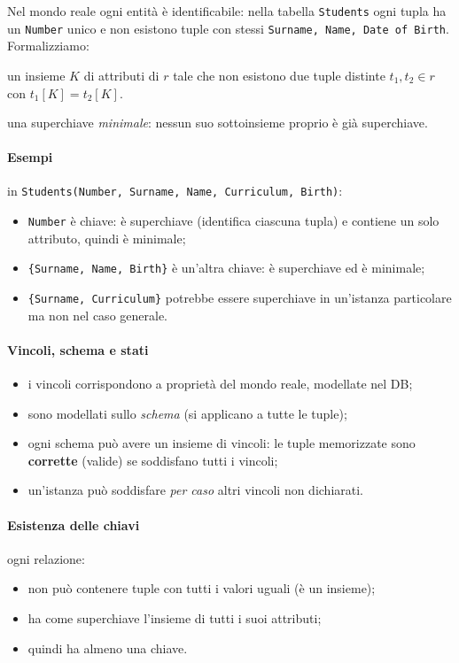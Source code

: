 \documentclass[a4paper,12pt]{article}
\begin{document}
Nel mondo reale ogni entità è identificabile: nella tabella \texttt{Students}
ogni tupla ha un \texttt{Number} unico e non esistono tuple con stessi
\texttt{Surname, Name, Date of Birth}. Formalizziamo:

\begin{description}[style=nextline]
  \item[Superchiave] un insieme $K$ di attributi di $r$ tale che non esistono
    due tuple distinte $t_1, t_2 \in r$ con $t_1[K] = t_2[K]$.
  \item[Chiave] una superchiave \emph{minimale}: nessun suo sottoinsieme
    proprio è già superchiave.
\end{description}

\paragraph{Esempi} in \texttt{Students(Number, Surname, Name, Curriculum,
Birth)}:
\begin{itemize}
  \item \texttt{Number} è chiave: è superchiave (identifica ciascuna tupla) e
    contiene un solo attributo, quindi è minimale;
  \item \texttt{\{Surname, Name, Birth\}} è un'altra chiave: è superchiave ed
    è minimale;
  \item \texttt{\{Surname, Curriculum\}} potrebbe essere superchiave in
    un'istanza particolare ma non nel caso generale.
\end{itemize}

\paragraph{Vincoli, schema e stati}
\begin{itemize}
  \item i vincoli corrispondono a proprietà del mondo reale, modellate nel DB;
  \item sono modellati sullo \emph{schema} (si applicano a tutte le tuple);
  \item ogni schema può avere un insieme di vincoli: le tuple memorizzate sono
    \textbf{corrette} (valide) se soddisfano tutti i vincoli;
  \item un'istanza può soddisfare \emph{per caso} altri vincoli non dichiarati.
\end{itemize}

\paragraph{Esistenza delle chiavi} ogni relazione:
\begin{itemize}
  \item non può contenere tuple con tutti i valori uguali (è un insieme);
  \item ha come superchiave l'insieme di tutti i suoi attributi;
  \item quindi ha almeno una chiave.
\end{itemize}
\end{document}
